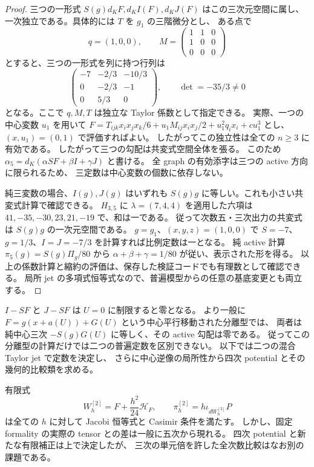 \begin{proof}
三つの一形式 $S(g)d_KF,d_KI(F),d_KJ(F)$ はこの三次元空間に属し、
一次独立である。具体的には $T$ を $g_1$ の三階微分とし、
ある点で
\[
 q=(1,0,0),\qquad
 M=\begin{pmatrix}1&1&0\\1&0&0\\0&0&0\end{pmatrix}
\]
とすると、三つの一形式を列に持つ行列は
\[
 \begin{pmatrix}
 -7&-2/3&-10/3\\
 0&-2/3&-1\\
 0&5/3&0
 \end{pmatrix},\qquad \det=-35/3\ne0
\]
となる。ここで $q,M,T$ は独立な Taylor 係数として指定できる。
実際、一つの中心変数 $u_1$ を用いて
$F=T_{ijk}x_ix_jx_k/6+u_1M_{ij}x_ix_j/2+u_1^2q_ix_i+cu_1^3$
とし、$(x,u_1)=(0,1)$ で評価すればよい。
したがってこの独立性は全ての $n\ge3$ に有効である。
したがって三つの勾配は共変式空間全体を張る。
このため $\alpha_5=d_K(\alpha SF+\beta I+\gamma J)$ と書ける。
全 graph の有効添字は三つの active 方向に限られるため、
三定数は中心変数の個数に依存しない。

純三変数の場合、$I(g),J(g)$ はいずれも
$S(g)g$ に等しい。これも小さい共変式計算で確認できる。
$H_{3,5}$ に $\lambda=(7,4,4)$ を適用した六項は
$41,-35,-30,23,21,-19$ で、和は一である。
従って次数五・三次出力の共変式は $S(g)g$ の一次元空間である。
$g=g_1$、$(x,y,z)=(1,0,0)$ で
$S=-7$、$g=1/3$、$I=J=-7/3$ を計算すれば比例定数は一となる。
純 active 計算 $\pi_5(g)=S(g)\Pi_g/80$ から
$\alpha+\beta+\gamma=1/80$ が従い、表示された形を得る。
以上の係数計算と縮約の評価は、保存した検証コードでも有理数として確認できる。
局所 jet の多項式恒等式なので、普遍模型からの任意の基底変更とも両立する。
\end{proof}

\begin{remark}[分離型で消える二方向]
\label{rem:nfm-mixed-fifth-potential}
$I-SF$ と $J-SF$ は $U=0$ に制限すると零となる。
より一般に $F=g(x+a(U))+G(U)$ という中心平行移動された分離型では、
両者は純中心三次 $-S(g)G(U)$ に等しく、その active 勾配は零である。
従ってこの分離型の計算だけでは二つの普遍定数を区別できない。
以下では二つの混合 Taylor jet で定数を決定し、
さらに中心逆像の局所性から四次 potential とその幾何的比較類を求める。
\end{remark}



有限式
\[
 W_h^{[2]}=F+\frac{h^2}{24}\mathscr H_F,\qquad
 \pi_h^{[2]}=h\iota_{dW_h^{[2]}}P
\]
は全ての $h$ に対して Jacobi 恒等式と Casimir 条件を満たす。
しかし、固定 formality の実際の tensor との差は一般に五次から現れる。
四次 potential と新たな有限補正は上で決定したが、
三次の単元倍を許した全次数比較はなお別の課題である。

